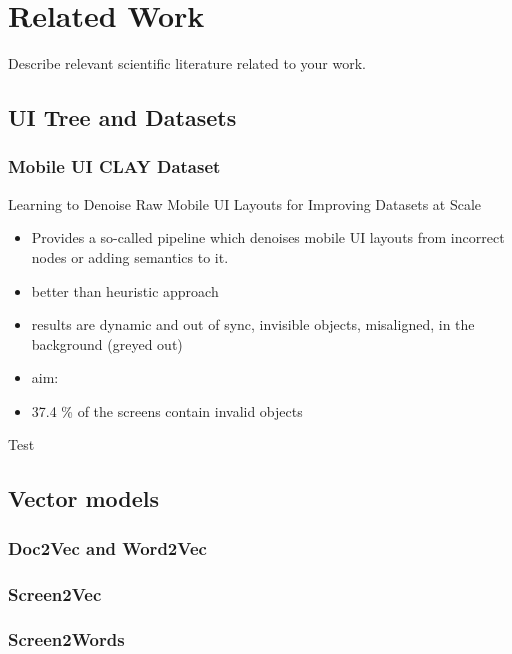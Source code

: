 \chapter{Related Work}

Describe relevant scientific literature related to your work.

\section{UI Tree and Datasets}



\subsection{Mobile UI CLAY Dataset}

Learning to Denoise Raw Mobile UI Layouts for Improving Datasets at Scale

\begin{itemize}
  \item Provides a so-called  pipeline which denoises mobile UI layouts from incorrect nodes or adding semantics to it.
  \item better than heuristic approach
  \item results are dynamic and out of sync, invisible objects, misaligned, in the background (greyed out)
  \item aim: 
  \item 37.4 \% of the screens contain invalid objects
\end{itemize}

Test \cite{clay}

\section{Vector models}

\subsection{Doc2Vec and Word2Vec}

\subsection{Screen2Vec}

\subsection{Screen2Words}

